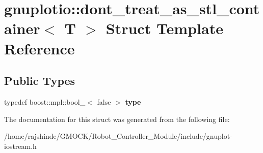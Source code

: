 \hypertarget{structgnuplotio_1_1dont__treat__as__stl__container}{}\section{gnuplotio\+:\+:dont\+\_\+treat\+\_\+as\+\_\+stl\+\_\+container$<$ T $>$ Struct Template Reference}
\label{structgnuplotio_1_1dont__treat__as__stl__container}
\subsection*{Public Types}
\begin{DoxyCompactItemize}
\item 
typedef boost\+::mpl\+::bool\+\_\+$<$ false $>$ {\bfseries type}\hypertarget{structgnuplotio_1_1dont__treat__as__stl__container_aa4404164a7547142376a9140ef07fd2a}{}\label{structgnuplotio_1_1dont__treat__as__stl__container_aa4404164a7547142376a9140ef07fd2a}

\end{DoxyCompactItemize}


The documentation for this struct was generated from the following file\+:\begin{DoxyCompactItemize}
\item 
/home/rajshinde/\+G\+M\+O\+C\+K/\+Robot\+\_\+\+Controller\+\_\+\+Module/include/gnuplot-\/iostream.\+h\end{DoxyCompactItemize}
